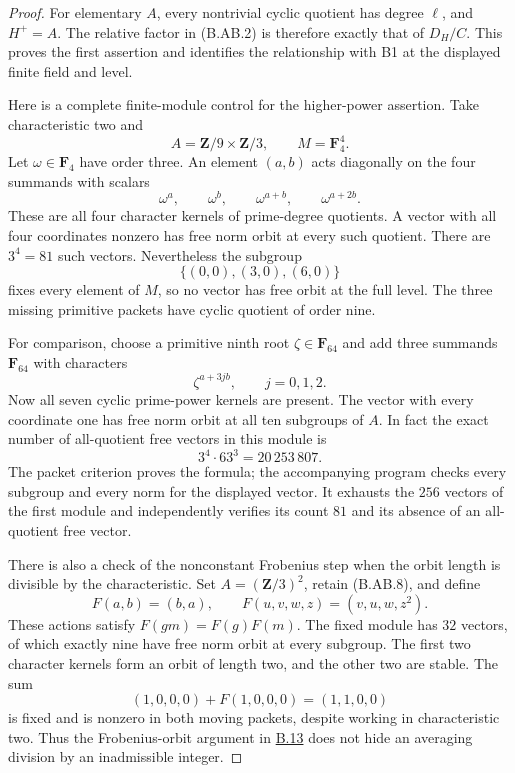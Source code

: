 \documentclass[11pt,a4paper]{article}
\newcommand{\statementref}[1]{\hyperlink{#1}{#1}}
\begin{document}
\begin{proof}
For elementary $A$, every nontrivial cyclic quotient has degree
$\ell$, and $H^+=A$. The relative factor in (B.AB.2) is
therefore exactly that of $D_H/C$. This proves the first
assertion and identifies the relationship with B1 at the
displayed finite field and level.

Here is a complete finite-module control for the higher-power
assertion. Take characteristic two and
\[
        A=\mathbf Z/9\times\mathbf Z/3,
                     \qquad M=\mathbf F_4^4.
\]
Let $\omega\in\mathbf F_4$ have order three. An element
$(a,b)$ acts diagonally on the four summands with scalars
\[
          \omega^a,\qquad\omega^b,\qquad
          \omega^{a+b},\qquad\omega^{a+2b}.                    \tag{B.AB.8}
\]
These are all four character kernels of prime-degree
quotients. A vector with all four coordinates nonzero has
free norm orbit at every such quotient. There are $3^4=81$
such vectors. Nevertheless the subgroup
\[
                   \{(0,0),(3,0),(6,0)\}
\]
fixes every element of $M$, so no vector has free orbit at
the full level. The three missing primitive packets have
cyclic quotient of order nine.

For comparison, choose a primitive ninth root
$\zeta\in\mathbf F_{64}$ and add three summands
$\mathbf F_{64}$ with characters
\[
                \zeta^{a+3jb},\qquad j=0,1,2.
\]
Now all seven cyclic prime-power kernels are present.
The vector with every coordinate one has free norm orbit
at all ten subgroups of $A$. In fact the exact number of
all-quotient free vectors in this module is
\[
                       3^4\cdot63^3=20\,253\,807.
\]
The packet criterion proves the formula; the accompanying
program checks every subgroup and every norm for the displayed
vector. It exhausts the $256$ vectors of the first module and
independently verifies its count $81$ and its absence of an
all-quotient free vector.

There is also a check of the nonconstant Frobenius step when
the orbit length is divisible by the characteristic. Set
$A=(\mathbf Z/3)^2$, retain (B.AB.8), and define
\[
 F(a,b)=(b,a),\qquad
             F(u,v,w,z)=(v,u,w,z^2).
\]
These actions satisfy $F(gm)=F(g)F(m)$. The fixed module
has $32$ vectors, of which exactly nine have free norm orbit
at every subgroup. The first two character kernels form an
orbit of length two, and the other two are stable. The sum
\[
                  (1,0,0,0)+F(1,0,0,0)=(1,1,0,0)
\]
is fixed and is nonzero in both moving packets, despite
working in characteristic two. Thus the Frobenius-orbit
argument in \statementref{B.13} does not hide an averaging
division by an inadmissible integer.


\end{proof}
\end{document}
